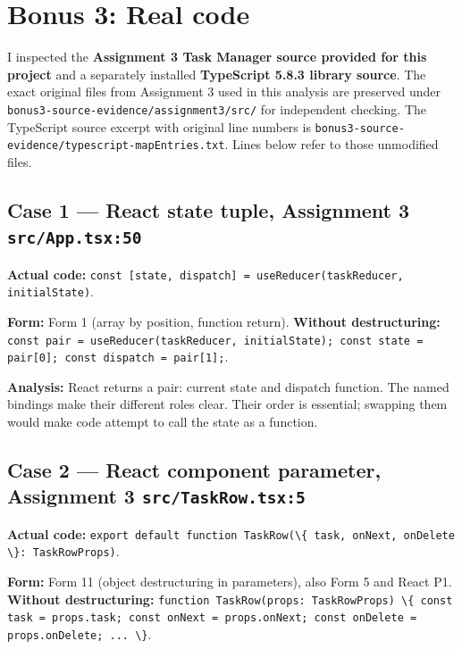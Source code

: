 \documentclass[
  9pt,
]{article}
\newcommand{\passthrough}[1]{#1}
\begin{document}
\section{Bonus 3: Real code}\label{bonus-3-real-code}

I inspected the \textbf{Assignment 3 Task Manager source provided for
this project} and a separately installed \textbf{TypeScript 5.8.3
library source}. The exact original files from Assignment 3 used in this
analysis are preserved under
\passthrough{\lstinline!bonus3-source-evidence/assignment3/src/!} for
independent checking. The TypeScript source excerpt with original line
numbers is
\passthrough{\lstinline!bonus3-source-evidence/typescript-mapEntries.txt!}.
Lines below refer to those unmodified files.

\subsection{\texorpdfstring{Case 1 --- React state tuple, Assignment 3
\texttt{src/App.tsx:50}}{Case 1 --- React state tuple, Assignment 3 src/App.tsx:50}}\label{case-1-react-state-tuple-assignment-3-srcapp.tsx50}

\textbf{Actual code:}
\passthrough{\lstinline!const [state, dispatch] = useReducer(taskReducer, initialState)!}.

\textbf{Form:} Form 1 (array by position, function return).
\textbf{Without destructuring:}
\passthrough{\lstinline!const pair = useReducer(taskReducer, initialState); const state = pair[0]; const dispatch = pair[1];!}.

\textbf{Analysis:} React returns a pair: current state and dispatch
function. The named bindings make their different roles clear. Their
order is essential; swapping them would make code attempt to call the
state as a function.

\subsection{\texorpdfstring{Case 2 --- React component parameter,
Assignment 3
\texttt{src/TaskRow.tsx:5}}{Case 2 --- React component parameter, Assignment 3 src/TaskRow.tsx:5}}\label{case-2-react-component-parameter-assignment-3-srctaskrow.tsx5}

\textbf{Actual code:}
\passthrough{\lstinline!export default function TaskRow(\{ task, onNext, onDelete \}: TaskRowProps)!}.

\textbf{Form:} Form 11 (object destructuring in parameters), also Form 5
and React P1. \textbf{Without destructuring:}
\passthrough{\lstinline!function TaskRow(props: TaskRowProps) \{ const task = props.task; const onNext = props.onNext; const onDelete = props.onDelete; ... \}!}.
\end{document}
